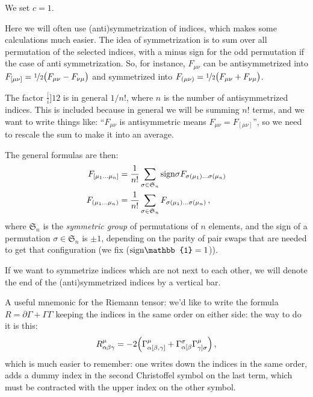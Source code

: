 \documentclass[main.tex]{subfiles}
\begin{document}
We set $c=1$.

Here we will often use (anti)symmetrization of indices, which makes some calculations much easier. The idea of symmetrization is to sum over all permutation of the selected indices, with a minus sign for the odd permutation if the case of anti symmetrization. So, for instance, \(F_{\mu \nu }\) can be antisymmetrized into \(F_{[\mu \nu ]} = \frac[i]{1}{2} \qty(F_{\mu \nu }- F_{\nu \mu })\) and symmetrized into \(F_{(\mu \nu )}= \frac[i]{1}{2} \qty(F_{\mu \nu } + F_{\nu \mu })\).

The factor \(\frac[i]{1}{2} \) is in general \(1/n!\), where \(n\) is the number of antisymmetrized indices. This is included because in general we will be summing \(n!\) terms, and we want to write things like: ``\(F_{\mu \nu }\) is antisymmetric means \(F_{\mu \nu} = F_{[\mu \nu ]}\)'', so we need to rescale the sum to make it into an average.

The general formulas are then: 
%
\begin{subequations}
\begin{align}
  F_{[\mu_{1} \dots \mu_{n}]} &= \frac{1}{n!} \sum _{\sigma  \in \mathfrak{S}_n} \sign{\sigma} F_{\sigma (\mu_1)\dots \sigma(\mu_n)} \\
  F_{(\mu_{1} \dots \mu_{n})} &= \frac{1}{n!} \sum _{\sigma  \in \mathfrak{S}_n}F_{\sigma (\mu_1)\dots \sigma(\mu_n)}
\,,  
\end{align}
\end{subequations}
%
where \(\mathfrak{S}_n\) is the \emph{symmetric group} of permutations of \(n\) elements, and the sign of a permutation \(\sigma \in \mathfrak S_n\) is \(\pm 1\), depending on the parity of pair swaps that are needed to get that configuration (we fix (\(\sign{\mathbb{1}} = 1\))). 

If we want to symmetrize indices which are not next to each other, we will denote the end of the (anti)symmetrized indices by a vertical bar.

A useful mnemonic for the Riemann tensor: we'd like to write the formula \(R = \partial \Gamma  + \Gamma \Gamma \) keeping the indices in the same order on either side: the way to do it is this: 
%
\begin{align}
  R^{\mu }_{\alpha \beta \gamma } = -2 \qty(
    \Gamma^{\mu }_{\alpha [\beta , \gamma ]}
    + \Gamma^{\sigma }_{\alpha [\beta } \Gamma^{\mu }_{\gamma ] \sigma }
  )
\,,
\end{align}
%
which is much easier to remember: one writes down the indices in the same order, adds a dummy index in the second Christoffel symbol on the last term, which must be contracted with the upper index on the other symbol. 
\end{document}
